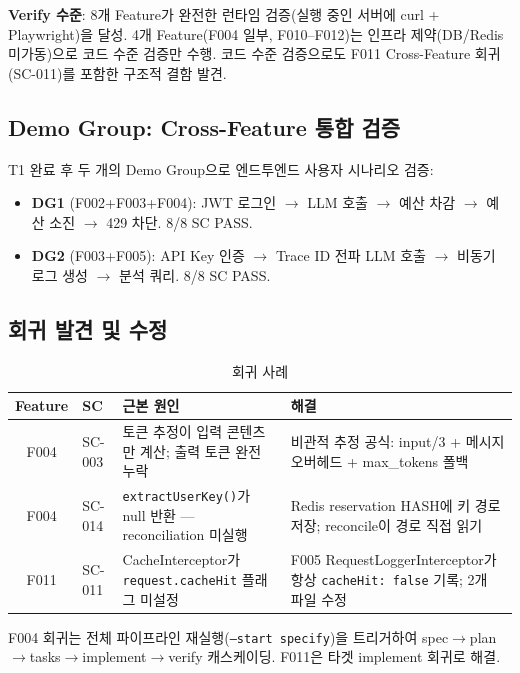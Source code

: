 \documentclass[11pt,a4paper,openright,twoside]{report}
\begin{document}
\textbf{Verify 수준}: 8개 Feature가 완전한 런타임 검증(실행 중인 서버에 curl + Playwright)을 달성. 4개 Feature(F004 일부, F010--F012)는 인프라 제약(DB/Redis 미가동)으로 코드 수준 검증만 수행. 코드 수준 검증으로도 F011 Cross-Feature 회귀(SC-011)를 포함한 구조적 결함 발견.

\subsection{Demo Group: Cross-Feature 통합 검증}

T1 완료 후 두 개의 Demo Group으로 엔드투엔드 사용자 시나리오 검증:

\begin{itemize}[nosep]
  \item \textbf{DG1} (F002+F003+F004): JWT 로그인 $\to$ LLM 호출 $\to$ 예산 차감 $\to$ 예산 소진 $\to$ 429 차단. 8/8 SC PASS.
  \item \textbf{DG2} (F003+F005): API Key 인증 $\to$ Trace ID 전파 LLM 호출 $\to$ 비동기 로그 생성 $\to$ 분석 쿼리. 8/8 SC PASS.
\end{itemize}

\subsection{회귀 발견 및 수정}

\begin{table}[H]
\centering
\caption{회귀 사례}
\label{tab:aegis-regressions-ko}
\begin{tabularx}{\textwidth}{clXX}
\toprule
\textbf{Feature} & \textbf{SC} & \textbf{근본 원인} & \textbf{해결} \\
\midrule
F004 & SC-003 & 토큰 추정이 입력 콘텐츠만 계산; 출력 토큰 완전 누락 & 비관적 추정 공식: input/3 + 메시지 오버헤드 + max\_tokens 폴백 \\
F004 & SC-014 & \texttt{extractUserKey()}가 null 반환 --- reconciliation 미실행 & Redis reservation HASH에 키 경로 저장; reconcile이 경로 직접 읽기 \\
F011 & SC-011 & CacheInterceptor가 \texttt{request.cacheHit} 플래그 미설정 & F005 RequestLoggerInterceptor가 항상 \texttt{cacheHit:~false} 기록; 2개 파일 수정 \\
\bottomrule
\end{tabularx}
\end{table}

F004 회귀는 전체 파이프라인 재실행(\texttt{--start specify})을 트리거하여 spec$\to$plan$\to$tasks$\to$implement$\to$verify 캐스케이딩. F011은 타겟 implement 회귀로 해결.
\end{document}
